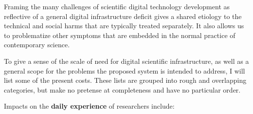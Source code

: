 \documentclass[11pt]{article}
\begin{document}
\begin{multicols}{2}


Framing the many challenges of scientific digital technology development
as reflective of a general digital infrastructure deficit gives a shared
etiology to the technical and social harms that are typically treated
separately. It also allows us to problematize other symptoms that are
embedded in the normal practice of contemporary science.

To give a sense of the scale of need for digital scientific
infrastructure, as well as a general scope for the problems the proposed
system is intended to address, I will list some of the present costs.
These lists are grouped into rough and overlapping categories, but make
no pretense at completeness and have no particular order.

Impacts on the \textbf{daily experience} of researchers include:

\begin{itemize}


\end{itemize}
\end{multicols}
\end{document}
